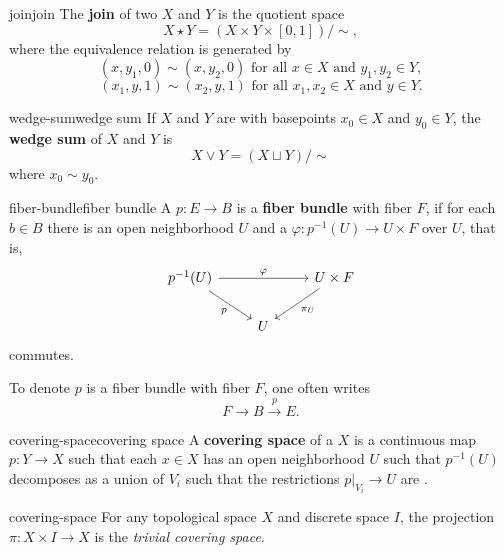 \begin{topic}{join}{join}
    The \textbf{join} of two  $X$ and $Y$ is the quotient space
    \[ X \star Y = (X \times Y \times [0, 1]) / \sim{} , \]
    where the equivalence relation is generated by
    \[ (x, y_1, 0) \sim{} (x, y_2, 0) \text{ for all } x \in X \text{ and } y_1, y_2 \in Y , \]
    \[ (x_1, y, 1) \sim{} (x_2, y, 1) \text{ for all } x_1, x_2 \in X \text{ and } y \in Y . \]
\end{topic}

\begin{topic}{wedge-sum}{wedge sum}
    If $X$ and $Y$ are  with basepoints $x_0 \in X$ and $y_0 \in Y$, the \textbf{wedge sum} of $X$ and $Y$ is 
    \[ X \vee Y = (X \sqcup Y) / \sim{} \]
    where $x_0 \sim{} y_0$.
\end{topic}

\begin{topic}{fiber-bundle}{fiber bundle}
    A  $p \colon E \to B$ is a \textbf{fiber bundle} with fiber $F$, if for each $b \in B$ there is an open neighborhood $U$ and a  $\varphi \colon p^{-1}(U) \to U \times F$ over $U$, that is,
    \[ \svg \begin{tikzcd}
        p^{-1}(U) \arrow{rr}{\varphi} \arrow[swap]{dr}{p} && U \times F \arrow{ld}{\pi_U} \\ & U &
    \end{tikzcd} \]
    commutes.
    
    To denote $p$ is a fiber bundle with fiber $F$, one often writes
    \[ F \to B \xrightarrow{p} E . \]
\end{topic}

\begin{topic}{covering-space}{covering space}
    A \textbf{covering space} of a  $X$ is a continuous map $p \colon Y \to X$ such that each $x \in X$ has an open neighborhood $U$ such that $p^{-1}(U)$ decomposes as a union of $V_i$ such that the restrictions $p|_{V_i} \to U$ are .
\end{topic}

\begin{example}{covering-space}
    For any topological space $X$ and discrete space $I$, the projection $\pi \colon X \times I \to X$ is the \textit{trivial covering space}.
\end{example}

